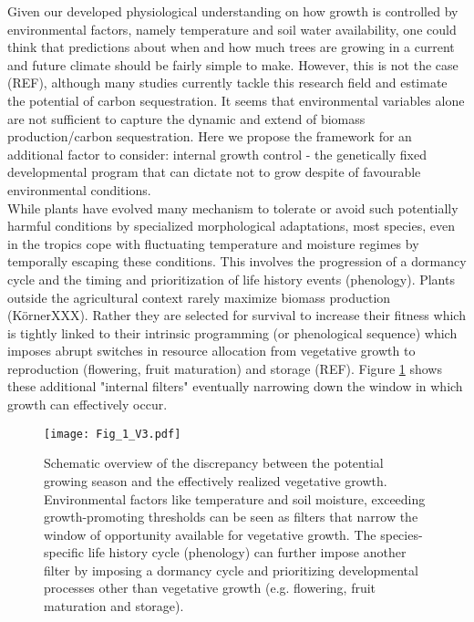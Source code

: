 \documentclass{article}
\begin{document}
		Given our developed physiological understanding on how growth is controlled by environmental factors, namely temperature and soil water availability, one could think that predictions about when and how much trees are growing in a current and future climate should be fairly simple to make. However, this is not the case (REF), although many studies currently tackle this research field and estimate the potential of carbon sequestration. It seems that environmental variables alone are not sufficient to capture the dynamic and extend of biomass production/carbon sequestration.  Here we propose the framework for an additional factor to consider: internal growth control - the genetically fixed developmental program that can dictate not to grow despite of favourable environmental conditions.\\
		
		While plants have evolved many mechanism to tolerate or avoid such potentially harmful conditions by specialized morphological adaptations, most species, even in the tropics cope with fluctuating temperature and moisture regimes by temporally escaping these conditions. This involves the progression of a dormancy cycle and the timing and prioritization of life history events (phenology). Plants outside the agricultural context rarely maximize biomass production (KörnerXXX). Rather they are selected for survival to increase their fitness which is tightly linked to their intrinsic programming (or phenological sequence) which imposes abrupt switches in resource allocation from vegetative growth to reproduction (flowering, fruit maturation) and storage (REF). Figure \ref{fig:fig_1xxx} shows these additional "internal filters" eventually narrowing down the window in which growth can effectively occur.

								\begin{figure}
								\centering
								\texttt{[image: Fig\_1\_V3.pdf]} 
								\caption{Schematic overview of the discrepancy between the potential growing season and the effectively realized vegetative growth. Environmental factors like temperature and soil moisture, exceeding growth-promoting thresholds can be seen as filters that narrow the window of opportunity available for vegetative growth. The species-specific life history cycle (phenology) can further impose another filter by imposing a dormancy cycle and prioritizing developmental processes other than vegetative growth (e.g. flowering, fruit maturation and storage). }
								\label{fig:fig_1xxx}
							\end{figure}
\end{document}
